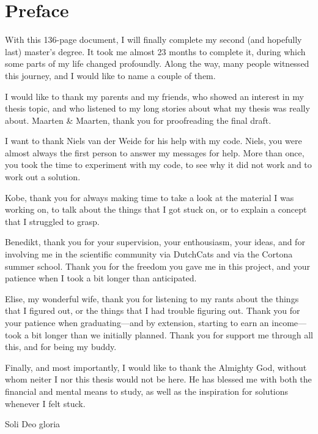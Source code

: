 \chapter{\label{chap:Preface}Preface}

With this 136-page document, I will finally complete my second (and hopefully last) master's degree. It took me almost 23 months to complete it, during which some parts of my life changed profoundly. Along the way, many people witnessed this journey, and I would like to name a couple of them.

I would like to thank my parents and my friends, who showed an interest in my thesis topic, and who listened to my long stories about what my thesis was really about.
Maarten \& Maarten, thank you for proofreading the final draft.

I want to thank Niels van der Weide for his help with my code. Niels, you were almost always the first person to answer my messages for help. More than once, you took the time to experiment with my code, to see why it did not work and to work out a solution.

Kobe, thank you for always making time to take a look at the material I was working on, to talk about the things that I got stuck on, or to explain a concept that I struggled to grasp.

Benedikt, thank you for your supervision, your enthousiasm, your ideas, and for involving me in the scientific community via DutchCats and via the Cortona summer school. Thank you for the freedom you gave me in this project, and your patience when I took a bit longer than anticipated.

Elise, my wonderful wife, thank you for listening to my rants about the things that I figured out, or the things that I had trouble figuring out. Thank you for your patience when graduating---{}and by extension, starting to earn an income---{}took a bit longer than we initially planned. Thank you for support me through all this, and for being my buddy.

Finally, and most importantly, I would like to thank the Almighty God, without whom neiter I nor this thesis would not be here. He has blessed me with both the financial and mental means to study, as well as the inspiration for solutions whenever I felt stuck.

\newpage

\thispagestyle{empty}

\vspace*{\fill}
\begin{center}
    Soli Deo gloria
\end{center}
\vspace*{\fill}
